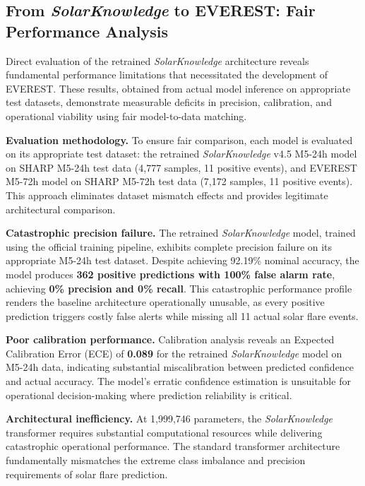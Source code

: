 \subsection{From \textit{SolarKnowledge} to \textsc{EVEREST}: Fair Performance Analysis}
\label{sec:sk2ev-fair}

Direct evaluation of the retrained \textit{SolarKnowledge} architecture reveals fundamental performance limitations that necessitated the development of \textsc{EVEREST}. These results, obtained from actual model inference on appropriate test datasets, demonstrate measurable deficits in precision, calibration, and operational viability using fair model-to-data matching.

\textbf{Evaluation methodology.}
To ensure fair comparison, each model is evaluated on its appropriate test dataset: the retrained \textit{SolarKnowledge} v4.5 M5-24h model on SHARP M5-24h test data (4,777 samples, 11 positive events), and \textsc{EVEREST} M5-72h model on SHARP M5-72h test data (7,172 samples, 11 positive events). This approach eliminates dataset mismatch effects and provides legitimate architectural comparison.

\textbf{Catastrophic precision failure.}
The retrained \textit{SolarKnowledge} model, trained using the official training pipeline, exhibits complete precision failure on its appropriate M5-24h test dataset. Despite achieving 92.19\% nominal accuracy, the model produces \textbf{362 positive predictions with 100\% false alarm rate}, achieving \textbf{0\% precision and 0\% recall}. This catastrophic performance profile renders the baseline architecture operationally unusable, as every positive prediction triggers costly false alerts while missing all 11 actual solar flare events.

\textbf{Poor calibration performance.}
Calibration analysis reveals an Expected Calibration Error (ECE) of \textbf{0.089} for the retrained \textit{SolarKnowledge} model on M5-24h data, indicating substantial miscalibration between predicted confidence and actual accuracy. The model's erratic confidence estimation is unsuitable for operational decision-making where prediction reliability is critical.

\textbf{Architectural inefficiency.}
At 1,999,746 parameters, the \textit{SolarKnowledge} transformer requires substantial computational resources while delivering catastrophic operational performance. The standard transformer architecture fundamentally mismatches the extreme class imbalance and precision requirements of solar flare prediction.

